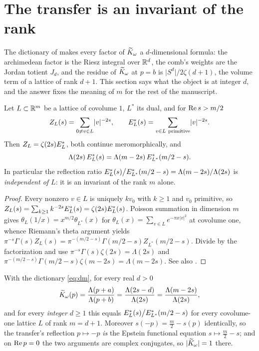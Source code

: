 \section{The transfer is an invariant of the rank}\label{sec:rank}

The dictionary of \cite{OpeningNote,WhichDimension} makes every factor of
$\widetilde K_\omega$ a $d$-dimensional formula: the archimedean factor is the Riesz
integral over $\mathbb R^{d}$, the comb's weights are the Jordan totient $J_d$, and the
residue of $\widetilde K_\omega$ at $p=b$ is $\lvert S^{d}\rvert/2\zeta(d+1)$, the volume
term of a lattice of rank $d+1$. This section says what the object is at integer
$d$, and the answer fixes the meaning of $m$ for the rest of the manuscript.

\begin{proposition}\label{prop:epstein}
Let $L\subset\mathbb R^{m}$ be a lattice of covolume $1$, $L^{*}$ its dual, and for
$\operatorname{Re} s>m/2$
\[
 Z_L(s)=\sum_{0\ne v\in L}\lvert v\rvert^{-2s},\qquad
 E^{*}_L(s)=\sum_{v\in L\ \mathrm{primitive}}\lvert v\rvert^{-2s} .
\]
Then $Z_L=\zeta(2s)E^{*}_L$, both continue meromorphically, and
\begin{equation}\label{eq:epsteinfe}
 \Lambda(2s)\,E^{*}_L(s)=\Lambda(m-2s)\,E^{*}_{L^{*}}(m/2-s).
\end{equation}
In particular the reflection ratio
$E^{*}_L(s)\big/E^{*}_{L^{*}}(m/2-s)=\Lambda(m-2s)/\Lambda(2s)$ is
\emph{independent of $L$}: it is an invariant of the rank $m$ alone.
\end{proposition}

\begin{proof}
Every nonzero $v\in L$ is uniquely $kv_0$ with $k\ge1$ and $v_0$ primitive, so
$Z_L(s)=\sum_{k\ge1}k^{-2s}E^{*}_L(s)=\zeta(2s)E^{*}_L(s)$. Poisson summation in
dimension $m$ gives $\theta_L(1/x)=x^{m/2}\theta_{L^{*}}(x)$ for
$\theta_L(x)=\sum_{v\in L}e^{-\pi x\lvert v\rvert^{2}}$ at covolume one, whence
Riemann's theta argument yields
$\pi^{-s}\Gamma(s)Z_L(s)=\pi^{-(m/2-s)}\Gamma(m/2-s)Z_{L^{*}}(m/2-s)$. Divide by
the factorization and use $\pi^{-s}\Gamma(s)\zeta(2s)=\Lambda(2s)$ and
$\pi^{-(m/2-s)}\Gamma(m/2-s)\zeta(m-2s)=\Lambda(m-2s)$. See also
\cite[Ch.~4]{Terras}.
\end{proof}

\begin{proposition}\label{prop:integerpoints}
With the dictionary \eqref{eq:dm}, for every real $d>0$
\begin{equation}\label{eq:dictionary}
 \widetilde K_\omega(p)=\frac{\Lambda(p+a)}{\Lambda(p+b)}
 =\frac{\Lambda(2s-d)}{\Lambda(2s)}=\frac{\Lambda(m-2s)}{\Lambda(2s)},
\end{equation}
and for every \emph{integer} $d\ge1$ this equals
$E^{*}_L(s)\big/E^{*}_{L^{*}}(m/2-s)$ for every covolume-one lattice $L$ of rank
$m=d+1$. Moreover $s(-p)=\frac m2-s(p)$ identically, so the transfer's
reflection $p\mapsto-p$ \emph{is} the Epstein functional equation
$s\mapsto\frac m2-s$; and on $\operatorname{Re} p=0$ the two arguments are complex conjugates,
so $\lvert\widetilde K_\omega\rvert=1$ there.
\end{proposition}

